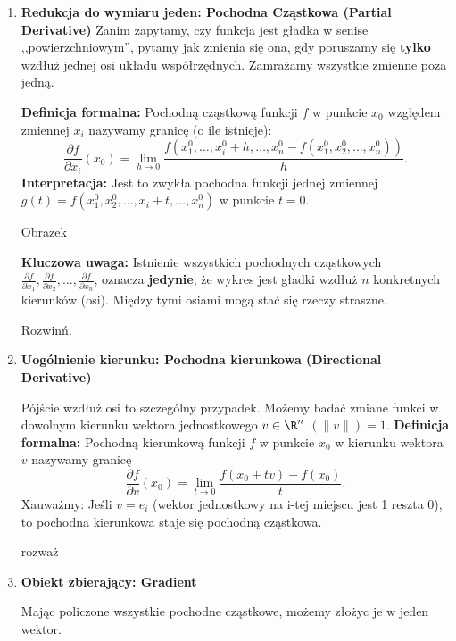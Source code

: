 \begin{enumerate}[label=\arabic*.]
	\item \textbf{Redukcja do wymiaru jeden: Pochodna Cząstkowa (Partial Derivative)} 
	Zanim zapytamy, czy funkcja jest gładka w senise ,,powierzchniowym'', pytamy jak zmienia się ona, gdy poruszamy się \textbf{tylko} wzdłuż jednej osi układu współrzędnych. Zamrażamy wszystkie zmienne poza jedną.

	\textbf{Definicja formalna:} Pochodną cząstkową funkcji $f$ w punkcie $x_0$ względem  zmiennej $x_{i}$ nazywamy granicę (o ile istnieje):
	\[
		\frac{\partial f}{\partial x_{i}} \left( x_0 \right) = \lim_{h \to 0} \frac{f\left( x_1^{0},\ldots,x_{i}^{0}+h,\ldots,x_{n}^{0}-f\left( x_1^{0}, x_2^{0},\ldots,x_{n}^{0} \right)  \right) }{h}
	.\] 
	\textbf{Interpretacja:} Jest to zwykła pochodna funkcji jednej zmiennej $g\left( t \right) = f\left( x_1^{0},x_2^{0},\ldots,x_{i}+t,\ldots, x_{n}^{0} \right) $ w punkcie $t = 0$.
	\begin{remark}
		Obrazek
	\end{remark} 

	\textbf{Kluczowa uwaga:} Istnienie wszystkich pochodnych cząstkowych $\frac{\partial f}{\partial x_1} , \frac{\partial f}{\partial x_2} ,\ldots, \frac{\partial f}{\partial x_{n}} $, oznacza \textbf{jedynie}, że wykres jest gładki wzdłuż $n$ konkretnych kierunków (osi). Między tymi osiami mogą stać się rzeczy straszne.
	\begin{remark}
		Rozwinń.
	\end{remark} 
\item \textbf{Uogólnienie kierunku: Pochodna kierunkowa (Directional Derivative)}

	Pójście wzdłuż osi to szczególny przypadek. Możemy badać zmiane  funkci w dowolnym kierunku wektora jednostkowego $v\in \R^{n}$ $\left( \|v\| \right) = 1$.
	\textbf{Definicja formalna:} Pochodną kierunkową funkcji $f$ w punkcie $x_0$ w kierunku wektora $v$ nazywamy granicę
	\[
		\frac{\partial f}{\partial v} \left( x_0 \right) = \lim_{t \to 0} \frac{f\left( x_0 + tv \right) - f\left( x_0 \right) }{t} 
	.\] 
	Xauważmy: Jeśli $v=e_{i}$ (wektor jednostkowy na i-tej miejscu jest 1 reszta 0), to pochodna kierunkowa staje się pochodną cząstkowa.
	\begin{remark}
		rozważ
	\end{remark} 
	\item	\textbf{Obiekt zbierający: Gradient} 

		Mając policzone wszystkie pochodne cząstkowe, możemy złożyc je w jeden wektor.


\end{enumerate}
